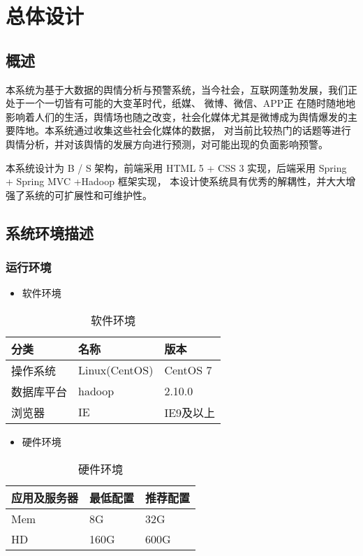 \section{总体设计}
\subsection{概述}
本系统为基于大数据的舆情分析与预警系统，当今社会，互联网蓬勃发展，我们正处于一个一切皆有可能的大变革时代，纸媒、 微博、微信、APP正
在随时随地地影响着人们的生活，舆情场也随之改变，社会化媒体尤其是微博成为舆情爆发的主要阵地。本系统通过收集这些社会化媒体的数据，
对当前比较热门的话题等进行舆情分析，并对该舆情的发展方向进行预测，对可能出现的负面影响预警。

本系统设计为 B / S 架构，前端采用 HTML 5 + CSS 3 实现，后端采用 Spring + Spring MVC +Hadoop 框架实现，
本设计使系统具有优秀的解耦性，并大大增强了系统的可扩展性和可维护性。
\subsection{系统环境描述}
\subsubsection{运行环境}
\begin{itemize}
\item 软件环境
\end{itemize}

\begin{table}[!htbp]
	\centering
	\caption{软件环境}
	\label{tab:my-table}
	\begin{tabular}{|l|l|l|}
		\hline
		分类 & 名称 & 版本 \\ \hline
		操作系统 & Linux(CentOS) & CentOS 7  \\ \hline
		数据库平台 & hadoop & 2.10.0  \\ \hline
		浏览器 & IE & IE9及以上  \\ \hline
	\end{tabular}
\end{table}
\begin{itemize}
	\item 硬件环境
\end{itemize}	
\begin{table}[!htbp]
	\centering
	\caption{硬件环境}
	\label{tab:my-table1}
	\begin{tabular}{|l|l|l|}
		\hline
		应用及服务器 & 最低配置 & 推荐配置 \\ \hline
		Mem & 8G & 32G \\ \hline
		HD & 160G & 600G \\ \hline
	\end{tabular}
\end{table}
